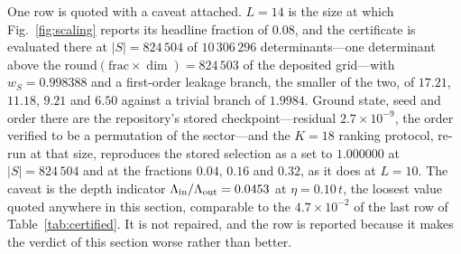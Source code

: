 One row is quoted with a caveat attached. $L=14$ is the size at which Fig.~\ref{fig:scaling}
reports its headline fraction of $0.08$, and the certificate is evaluated there at $\lvert S\rvert=824\,504$ of $10\,306\,296$ determinants---one determinant above the
$\mathrm{round}(\mathrm{frac}\times\dim)=824\,503$ of the deposited grid---with $w_S=0.998388$ and a
first-order leakage branch, the smaller of the two, of $17.21$, $11.18$, $9.21$ and $6.50$ against a trivial branch of $1.9984$. Ground
state, seed and order there are the repository's stored checkpoint---residual $2.7\times10^{-9}$, the
order verified to be a permutation of the sector---and the $K=18$ ranking protocol, re-run at that
size, reproduces the stored selection as a set to $1.000000$ at
$\lvert S\rvert=824\,504$ and at the fractions $0.04$, $0.16$ and $0.32$, as it does at $L=10$. The caveat is the
depth indicator $\Lambda_{\rm in}/\Lambda_{\rm out}=0.0453$ at $\eta=0.10\,t$, the loosest value
quoted anywhere in this section, comparable to the $4.7\times10^{-2}$ of the last row of
Table~\ref{tab:certified}. It is not repaired, and the row is reported because it makes the
verdict of this section worse rather than better.


